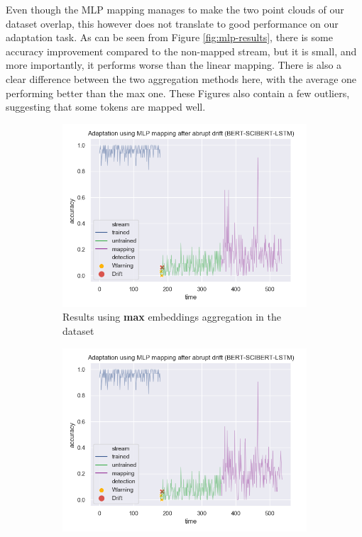 \documentclass[12pt]{extreport}
\begin{document}
Even though the MLP mapping manages to make the two point clouds of our dataset overlap, this however does not translate to good performance on our adaptation task. As can be seen from Figure \ref{fig:mlp-results}, there is some accuracy improvement compared to the non-mapped stream, but it is small, and more importantly, it performs worse than the linear mapping. There is also a clear difference between the two aggregation methods here, with the average one performing better than the max one. These Figures also contain a few outliers, suggesting that some tokens are mapped well.

\begin{figure}[H]
\centering
\begin{subfigure}{.49\textwidth}
\centering
\includegraphics[width=\linewidth]{assets/addressing-change/mlp_mapping_lstm_wos_1_BERT_SCIBERT_10000_words_max.png}
\caption{Results using \textbf{max} embeddings aggregation in the dataset}
\label{fig:mlp-max}
\end{subfigure}
\begin{subfigure}{.49\textwidth}
\centering
\includegraphics[width=\linewidth]{assets/addressing-change/mlp_mapping_lstm_wos_1_BERT_SCIBERT_10000_words_average.png}

\end{subfigure}
\end{figure}
\end{document}
